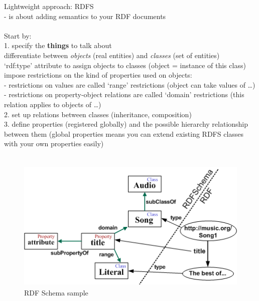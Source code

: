 Lightweight approach: RDFS \\
- is about adding semantics to your RDF documents \\
\\
Start by: \\
1. specify the \textbf{things} to talk about \\
   differentiate between \textit{objects} (real entities) and \textit{classes} (set of entities) \\
   `rdf:type' attribute to assign objects to classes (object = instance of this class) \\
   impose restrictions on the kind of properties used on objects: \\
   - restrictions on values are called `range' restrictions (object can take values of \ldots) \\
   - restrictions on property-object relations are called `domain' restrictions (this relation applies to objects of \ldots) \\
2. set up relations between classes (inheritance, composition) \\
3. define properties (registered globally) and the possible hierarchy relationship between them (global properties means you can
extend existing RDFS classes with your own properties easily) \\
\\
\begin{figure}[H]
	\centering
		\includegraphics[height=2.5in]{images/RDFSchema.png}
	\caption{RDF Schema sample}
\label{fig:images_rdfs_sample}
\end{figure}

